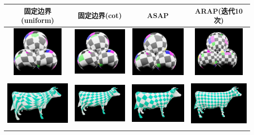 \documentclass[12pt]{article}
\begin{document}
\begin{table}[htb]
\begin{center}
\begin{tabular}{|c|c|c|c|}
  \hline
  固定边界(uniform) &固定边界(cot)&ASAP &ARAP(迭代10次) \\\hline

\includegraphics[height=1in]{13.png}&\includegraphics[height=1in]{14.png}&\includegraphics[height=1in]{15.png}&\includegraphics[height=1in]{16.png}\\
\includegraphics[height=1in]{23.png}&\includegraphics[height=1in]{24.png}&\includegraphics[height=1in]{25.png}&\includegraphics[height=1in]{26.png}\\

\end{tabular}
\end{center}
\end{table}
\end{document}
